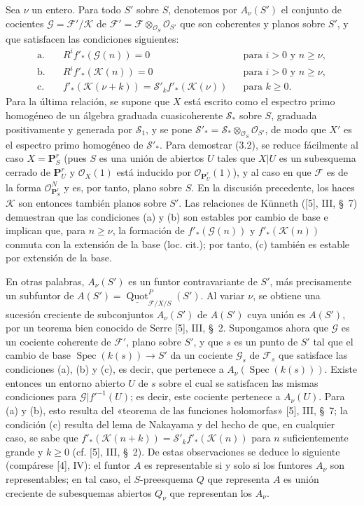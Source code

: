 Sea $\nu$ un entero. Para todo $S'$ sobre $S$, denotemos por $A_\nu(S')$ el
conjunto de cocientes $\mathcal G=\mathcal F'/\mathcal K$ de
$\mathcal F'=\mathcal F\otimes_{\mathcal O_S}\mathcal O_{S'}$ que son
coherentes y planos sobre $S'$, y que satisfacen las condiciones siguientes:
\begin{align*}
\text{a.}\quad &R^if'_*(\mathcal G(n))=0 &&\text{para $i>0$ y $n\geq\nu$},\\
\text{b.}\quad &R^if'_*(\mathcal K(n))=0 &&\text{para $i>0$ y $n\geq\nu$},\\
\text{c.}\quad &f'_*(\mathcal K(\nu+k))
=\mathcal S'_k f'_*(\mathcal K(\nu)) &&\text{para $k\geq0$}.
\end{align*}
Para la última relación, se supone que $X$ está escrito como el espectro primo
homogéneo de un álgebra graduada cuasicoherente $\mathcal S_*$ sobre $S$,
graduada positivamente y generada por $\mathcal S_1$, y se pone
$\mathcal S'_* =\mathcal S_*\otimes_{\mathcal O_S}\mathcal O_{S'}$, de modo
que $X'$ es el espectro primo homogéneo de $\mathcal S'_*$. Para demostrar
(3.2), se reduce fácilmente al caso $X=\mathbf P^r_S$ (pues $S$ es una unión
de abiertos $U$ tales que $X|U$ es un subesquema cerrado de $\mathbf P^r_U$ y
$\mathcal O_X(1)$ está inducido por $\mathcal O_{\mathbf P^r_U}(1)$), y al
caso en que $\mathcal F$ es de la forma
$\mathcal O_{\mathbf P^r_S}^{N}$ y es, por tanto, plano sobre $S$. En la
discusión precedente, los haces $\mathcal K$ son entonces también planos sobre
$S'$. Las relaciones de Künneth ([5], III, \S~7) demuestran que las condiciones
(a) y (b) son estables por cambio de base e implican que, para $n\geq\nu$, la
formación de $f'_*(\mathcal G(n))$ y $f'_*(\mathcal K(n))$ conmuta con la
extensión de la base (loc. cit.); por tanto, (c) también es estable por
extensión de la base.

En otras palabras, $A_\nu(S')$ es un funtor contravariante de $S'$, más
precisamente un subfuntor de
$A(S')=\underline{\operatorname{Quot}}^P_{\mathcal F/X/S}(S')$. Al variar
$\nu$, se obtiene una sucesión creciente de subconjuntos $A_\nu(S')$ de
$A(S')$ cuya unión es $A(S')$, por un teorema bien conocido de Serre [5], III,
\S~2. Supongamos ahora que $\mathcal G$ es un cociente coherente de
$\mathcal F'$, plano sobre $S'$, y que $s$ es un punto de $S'$ tal que el
cambio de base $\operatorname{Spec}(k(s))\longrightarrow S'$ da un cociente
$\mathcal G_s$ de $\mathcal F_s$ que satisface las condiciones (a), (b) y (c),
es decir, que pertenece a $A_\nu(\operatorname{Spec}(k(s)))$. Existe entonces
un entorno abierto $U$ de $s$ sobre el cual se satisfacen las mismas
condiciones para $\mathcal G|f'^{-1}(U)$; es decir, este cociente pertenece a
$A_\nu(U)$. Para (a) y (b), esto resulta del «teorema de las funciones
holomorfas» [5], III, \S~7; la condición (c) resulta del lema de Nakayama y del
hecho de que, en cualquier caso, se sabe que
$f'_*(\mathcal K(n+k))=\mathcal S'_k f'_*(\mathcal K(n))$
para $n$ suficientemente grande y $k\geq0$ (cf. [5], III, \S~2). De estas
observaciones se deduce lo siguiente (compárese [4], IV): el funtor $A$ es
representable si y solo si los funtores $A_\nu$ son representables; en tal
caso, el $S$-preesquema $Q$ que representa $A$ es unión creciente de
subesquemas abiertos $Q_\nu$ que representan los $A_\nu$.

